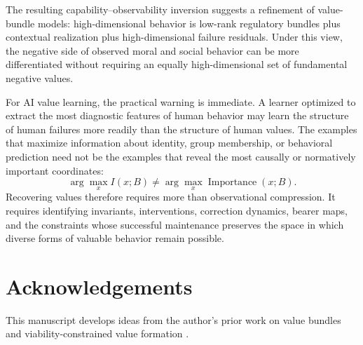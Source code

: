 \documentclass[11pt]{article}
\begin{document}
The resulting capability--observability inversion suggests a refinement of value-bundle models: high-dimensional behavior is low-rank regulatory bundles plus contextual realization plus high-dimensional failure residuals.
Under this view, the negative side of observed moral and social behavior can be more differentiated without requiring an equally high-dimensional set of fundamental negative values.

For AI value learning, the practical warning is immediate. A learner optimized to extract the most diagnostic features of human behavior may learn the structure of human failures more readily than the structure of human values. The examples that maximize information about identity, group membership, or behavioral prediction need not be the examples that reveal the most causally or normatively important coordinates:
\begin{equation}
    \boxed{
    \arg\max_x I(x;B)
    \neq
    \arg\max_x
    \operatorname{Importance}(x;B).
    }
\end{equation}
Recovering values therefore requires more than observational compression. It requires identifying invariants, interventions, correction dynamics, bearer maps, and the constraints whose successful maintenance preserves the space in which diverse forms of valuable behavior remain possible.

\section*{Acknowledgements}

This manuscript develops ideas from the author's prior work on value bundles \citep{zarncke2026vbd} and viability-constrained value formation \citep{zarncke2026evf}.



\end{document}
